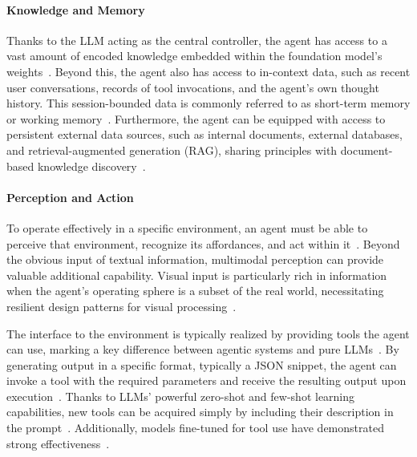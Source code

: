 \documentclass[pdflatex,sn-mathphys-num]{sn-jnl}%
\theoremstyle{thmstyleone}%
\theoremstyle{thmstyletwo}%
\theoremstyle{thmstylethree}%
\begin{document}
\paragraph{Knowledge and Memory}

Thanks to the LLM acting as the central controller, the agent has access to a vast amount of encoded knowledge embedded within the foundation model's weights~\cite{petroni2019language,yu2024kola}. Beyond this, the agent also has access to in-context data, such as recent user conversations, records of tool invocations, and the agent's own thought history. This session-bounded data is commonly referred to as short-term memory or working memory~\cite{zhang2024survey}. Furthermore, the agent can be equipped with access to persistent external data sources, such as internal documents, external databases, and retrieval-augmented generation (RAG), sharing principles with document-based knowledge discovery~\cite{hatalis2023memory,lewis2020retrieval,zeng2024structural,gidey2022document}.

\paragraph{Perception and Action}

To operate effectively in a specific environment, an agent must be able to perceive that environment, recognize its affordances, and act within it~\cite{shen2024llm,gidey2025affordance}. Beyond the obvious input of textual information, multimodal perception can provide valuable additional capability. 
Visual input is particularly rich in information when the agent's operating sphere is a subset of the real world, necessitating resilient design patterns for visual processing~\cite{guo2022images,peng2023kosmos,pi2024perceptiongpt,gidey2026pattern}.

The interface to the environment is typically realized by providing tools the agent can use, marking a key difference between agentic systems and pure LLMs~\cite{ruan2023tptu,shen2024llm}. By generating output in a specific format, typically a JSON snippet, the agent can invoke a tool with the required parameters and receive the resulting output upon execution~\cite{shen2024llm}. Thanks to LLMs' powerful zero-shot and few-shot learning capabilities, new tools can be acquired simply by including their description in the prompt~\cite{ruan2023tptu,yao2023react}. Additionally, models fine-tuned for tool use have demonstrated strong effectiveness~\cite{shen2024llm,qin2023toolllmfacilitatinglargelanguage}.
\end{document}
